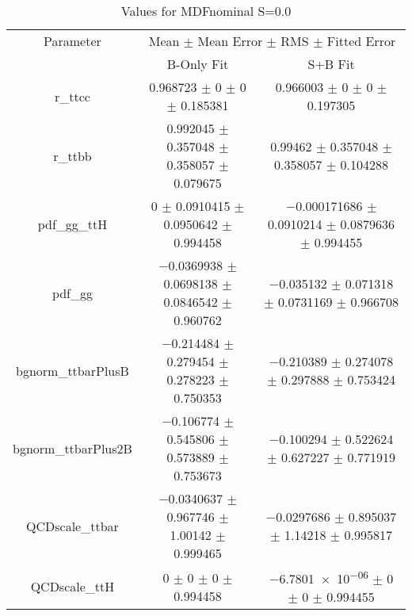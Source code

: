 \begin{table}
\centering
\caption{Values for MDFnominal S=0.0}
\begin{tabular}{ccc}
\toprule
Parameter & \multicolumn{2}{c}{Mean $\pm$ Mean Error $\pm$ RMS $\pm$ Fitted Error}\\
 & B-Only Fit & S+B Fit\\
\midrule
r\_ttcc & \num{0.968723} $\pm$ \num{0} $\pm$ \num{0} $\pm$ \num{0.185381} & \num{0.966003} $\pm$ \num{0} $\pm$ \num{0} $\pm$ \num{0.197305}\\
r\_ttbb & \num{0.992045} $\pm$ \num{0.357048} $\pm$ \num{0.358057} $\pm$ \num{0.079675} & \num{0.99462} $\pm$ \num{0.357048} $\pm$ \num{0.358057} $\pm$ \num{0.104288}\\
pdf\_gg\_ttH & \num{0} $\pm$ \num{0.0910415} $\pm$ \num{0.0950642} $\pm$ \num{0.994458} & \num{-0.000171686} $\pm$ \num{0.0910214} $\pm$ \num{0.0879636} $\pm$ \num{0.994455}\\
pdf\_gg & \num{-0.0369938} $\pm$ \num{0.0698138} $\pm$ \num{0.0846542} $\pm$ \num{0.960762} & \num{-0.035132} $\pm$ \num{0.071318} $\pm$ \num{0.0731169} $\pm$ \num{0.966708}\\
bgnorm\_ttbarPlusB & \num{-0.214484} $\pm$ \num{0.279454} $\pm$ \num{0.278223} $\pm$ \num{0.750353} & \num{-0.210389} $\pm$ \num{0.274078} $\pm$ \num{0.297888} $\pm$ \num{0.753424}\\
bgnorm\_ttbarPlus2B & \num{-0.106774} $\pm$ \num{0.545806} $\pm$ \num{0.573889} $\pm$ \num{0.753673} & \num{-0.100294} $\pm$ \num{0.522624} $\pm$ \num{0.627227} $\pm$ \num{0.771919}\\
QCDscale\_ttbar & \num{-0.0340637} $\pm$ \num{0.967746} $\pm$ \num{1.00142} $\pm$ \num{0.999465} & \num{-0.0297686} $\pm$ \num{0.895037} $\pm$ \num{1.14218} $\pm$ \num{0.995817}\\
QCDscale\_ttH & \num{0} $\pm$ \num{0} $\pm$ \num{0} $\pm$ \num{0.994458} & \num{-6.7801e-06} $\pm$ \num{0} $\pm$ \num{0} $\pm$ \num{0.994455}\\
\bottomrule
\end{tabular}
\end{table}